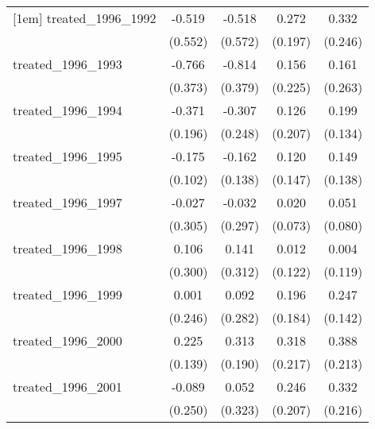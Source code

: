 {\begin{tabular}{l*{4}{c}}
[1em]
treated\_1996\_1992&      -0.519         &      -0.518         &       0.272         &       0.332         \\
            &     (0.552)         &     (0.572)         &     (0.197)         &     (0.246)         \\
[1em]
treated\_1996\_1993&      -0.766\sym{*}  &      -0.814\sym{*}  &       0.156         &       0.161         \\
            &     (0.373)         &     (0.379)         &     (0.225)         &     (0.263)         \\
[1em]
treated\_1996\_1994&      -0.371         &      -0.307         &       0.126         &       0.199         \\
            &     (0.196)         &     (0.248)         &     (0.207)         &     (0.134)         \\
[1em]
treated\_1996\_1995&      -0.175         &      -0.162         &       0.120         &       0.149         \\
            &     (0.102)         &     (0.138)         &     (0.147)         &     (0.138)         \\
[1em]
treated\_1996\_1997&      -0.027         &      -0.032         &       0.020         &       0.051         \\
            &     (0.305)         &     (0.297)         &     (0.073)         &     (0.080)         \\
[1em]
treated\_1996\_1998&       0.106         &       0.141         &       0.012         &       0.004         \\
            &     (0.300)         &     (0.312)         &     (0.122)         &     (0.119)         \\
[1em]
treated\_1996\_1999&       0.001         &       0.092         &       0.196         &       0.247         \\
            &     (0.246)         &     (0.282)         &     (0.184)         &     (0.142)         \\
[1em]
treated\_1996\_2000&       0.225         &       0.313         &       0.318         &       0.388         \\
            &     (0.139)         &     (0.190)         &     (0.217)         &     (0.213)         \\
[1em]
treated\_1996\_2001&      -0.089         &       0.052         &       0.246         &       0.332         \\
            &     (0.250)         &     (0.323)         &     (0.207)         &     (0.216)         \\

\end{tabular}}
